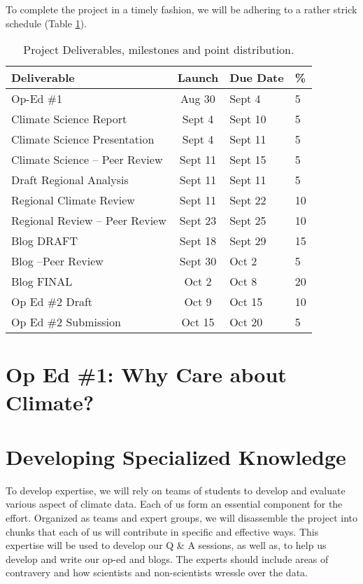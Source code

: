 \documentclass{article}\usepackage[]{graphicx}\usepackage[]{color}
\begin{document}
To complete the project in a timely fashion, we will be adhering to a rather strick schedule (Table \ref{tab:milestones}).

\begin{table}[h]

\caption{Project Deliverables, milestones and point distribution.}\label{tab:milestones}
\begin{tabular}{lcll}\hline
Deliverable                     & Launch    & Due Date  & \% \\\hline\hline
Op-Ed \#1                   & Aug 30    & Sept 4    & 5 \\
Climate Science Report      & Sept 4    & Sept 10   & 5 \\
Climate Science Presentation& Sept 4    & Sept 11   & 5 \\
Climate Science -- Peer Review  & Sept 11 & Sept 15 & 5 \\
Draft Regional Analysis     & Sept 11   & Sept 11   & 5 \\
Regional Climate Review     & Sept 11   & Sept 22   & 10 \\
Regional Review -- Peer Review & Sept 23   & Sept 25 & 10 \\
Blog DRAFT                  & Sept 18   & Sept 29    & 15 \\
Blog --Peer Review          & Sept 30   & Oct 2     & 5\\
Blog FINAL                  & Oct 2     & Oct 8    & 20 \\
Op Ed \#2 Draft             & Oct 9     & Oct 15    & 10 \\
Op Ed \#2 Submission        & Oct 15    & Oct 20    & 5 \\ \hline
\end{tabular}
\end{table}

\section{Op Ed \#1: Why Care about Climate?}



\section{Developing Specialized Knowledge}

To develop expertise, we will rely on teams of students to develop and evaluate various aspect of climate data. Each of us form an essential component for the effort. Organized as teams and expert groups, we will disassemble the project into chunks that each of us will contribute in specific and effective ways. This expertise will be used to develop our Q \& A sessions, as well as, to help us develop and write our op-ed and blogs. The experts should include areas of contravery and how scientists and non-scientists wressle over the data.
\end{document}
